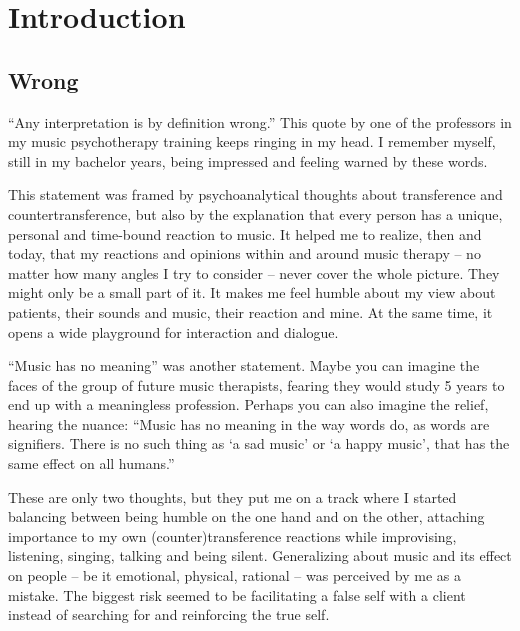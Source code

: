 \documentclass[authordate, empirical]{jote-new-article}
\author[1]{\mbox{Nele Fiers\orcid{0000-0002-8394-8598}}}
\affil[1]{Kliniek Sint-Jozef Pittem - Muze op maat}
\begin{document}
\begin{frontmatter}
  \maketitle
  \begin{abstract}
    \printabstracttext
  \end{abstract}
\end{frontmatter}


\section{Introduction}
	\subsection{Wrong}

	“Any interpretation is by definition wrong.” This quote by one of the professors in my music psychotherapy training keeps ringing in my head. I remember myself, still in my bachelor years, being impressed and feeling warned by these words.



	This statement was framed by psychoanalytical thoughts about transference and countertransference, but also by the explanation that every person has a unique, personal and time-bound reaction to music. It helped me to realize, then and today, that my reactions and opinions within and around music therapy -- no matter how many angles I try to consider -- never cover the whole picture. They might only be a small part of it. It makes me feel humble about my view about patients, their sounds and music, their reaction and mine. At the same time, it opens a wide playground for interaction and dialogue.



	“Music has no meaning” was another statement. Maybe you can imagine the faces of the group of future music therapists, fearing they would study 5 years to end up with a meaningless profession. Perhaps you can also imagine the relief, hearing the nuance: “Music has no meaning in the way words do, as words are signifiers. There is no such thing as ‘a sad music' or ‘a happy music', that has the same effect on all humans.”



	These are only two thoughts, but they put me on a track where I started balancing between being humble on the one hand and on the other, attaching importance to my own (counter)transference reactions while improvising, listening, singing, talking and being silent. Generalizing about music and its effect on people -- be it emotional, physical, rational -- was perceived by me as a mistake. The biggest risk seemed to be facilitating a false self with a client instead of searching for and reinforcing the true self.
\end{document}
